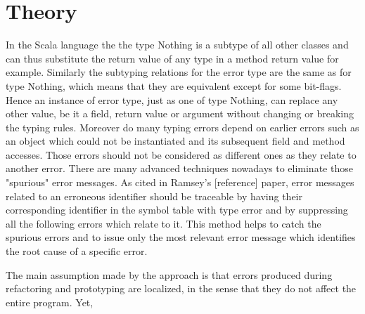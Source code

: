 \section{Theory}

In the Scala language the the type {\ttfamily Nothing} is a subtype of all other classes and can thus substitute the return value of any type in a method return value for example.
Similarly the subtyping relations for the error type are the same as for type {\ttfamily Nothing}, which means that they are equivalent except for some bit-flags. Hence an instance of error type, just as one of type {\ttfamily Nothing}, can replace any other value, be it a field, return value or argument without changing or breaking the typing rules.
Moreover do many typing errors depend on earlier errors such as an object which could not be instantiated and its subsequent field and method accesses. Those errors should not be considered as different ones as they relate to another error. There are many advanced techniques nowadays to eliminate those "spurious" error messages. As cited in Ramsey's [reference] paper, error messages related to an erroneous identifier should be traceable by having their corresponding identifier in the symbol table with type error and by suppressing all the following errors which relate to it. This method helps to catch the spurious errors and to issue only the most relevant error message which identifies the root cause of a specific error.

The main assumption made by the approach is that errors produced during refactoring and prototyping are localized, in the sense that they do not affect the entire program. Yet, 


